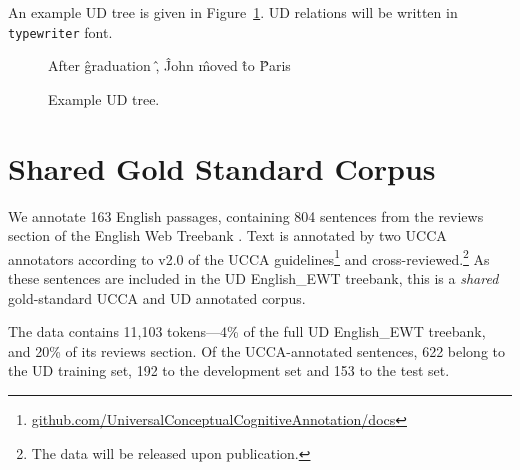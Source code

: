 \documentclass[11pt,a4paper]{article}
\newcommand{\daniel}[1]{\footnote{\color{blue}DH: #1}}
\begin{document}
An example UD tree is given in Figure~\ref{fig:original_example_ud}.
UD relations will be written in \texttt{typewriter} font.

\begin{figure}[th]
  \centering
    \begin{dependency}[text only label, label style={above,font=\tt}, font=\small]
    \begin{deptext}[column sep=.8em,ampersand replacement=\^]
    After \^ graduation \^ , \^ John \^ moved \^ to \^ Paris \\
    \end{deptext}
    \end{dependency}
\caption{Example UD tree.\label{fig:original_example_ud}}
\end{figure}


\section{Shared Gold Standard Corpus}\label{sec:shared}

We annotate 163 English passages, containing 804 sentences
from the reviews section of the 
English Web Treebank \cite[EWT; ][]{bies2012english}.
Text is annotated by two UCCA annotators
according to v2.0 of the UCCA
guidelines\footnote{\tiny\url{github.com/UniversalConceptualCognitiveAnnotation/docs}}
and cross-reviewed.\footnote{The data will be released upon publication.}
As these sentences are included in the UD
English\_EWT treebank, this is a \textit{shared} gold-standard UCCA and UD
annotated corpus.

The data contains 11,103 tokens---4\% of the full UD English\_EWT treebank,
and 20\% of its reviews section.
Of the UCCA-annotated sentences, 622 belong to the UD training set,
192 to the development set and 153 to the test set.


\end{document}
